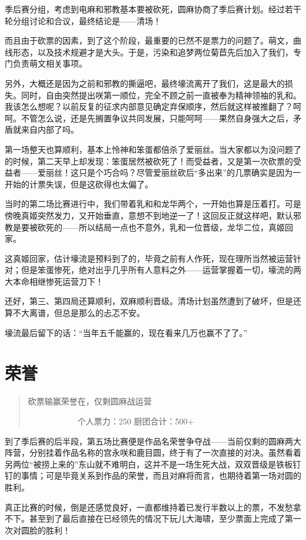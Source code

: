 季后赛分组，考虑到电麻和邪教基本要被砍死，圆麻协商了季后赛计划。经过若干轮分组讨论和合议，最终结论是——清场！

而且由于砍票的因素，到了这个阶段，最重要的已然不是票力的问题了。萌文，曲线形态，以及技术规避才是大头。于是，污染和追梦两位菊苣先后加入了我们，专门负责萌文相关事项。

另外，大概还是因为之前和邪教的撕逼吧，最终壕流离开了我们，这是最大的损失。同时，自由突然提出咲第一顺位，完全不顾之前一直被奉为精神领袖的乳和。我该怎么想呢？以前反复的征求内部意见确定弃保顺序，然后就这样被推翻了？呵呵。不管怎么说，还是先搁置争议共同发展，只能呵呵——果然自身强大之后，矛盾就来自内部了吗。

第一场整天也算顺利，基本上怜神和笨蛋都倍杀了爱丽丝。当大家都以为没问题了的时候，第二天早上却发现：笨蛋居然被砍死了！而受益者，又是第一次砍票的受益者——爱丽丝！这只是个巧合吗？尽管爱丽丝砍后“多出来”的几票确实是因为一开始的计票失误，但是这砍得也太偏了。

当时的第二场比赛进行中，我们带着乳和和龙华两个，一开始也算是压着打。可是傍晚真姬突然发力，又开始垂直，意想不到地逆一了！这回反正就这样吧，默认邪教是要被砍死的——所以结局一点也不意外，乳和一位晋级，龙华二位，真姬回家。

这真姬回家，估计壕流是预料到了的，毕竟之前有人作死，现在理所当然被运营针对；但是笨蛋惨死，绝对出乎几乎所有人意料之外——运营掌握着一切，壕流的两大本命相继惨死运营刀下！

还好，第三、第四局还算顺利，双麻顺利晋级。清场计划虽然遭到了破坏，但是还算不大离谱，但总是那么的忐忑不安。

壕流最后留下的话：“当年五千能赢的，现在看来几万也赢不了了。”


\section{荣誉}
\begin{quote}
砍票输赢荣誉在，仅剩圆麻战运营

　　　　　　个人票力：250 厨团合计：500+
\end{quote}

到了季后赛的后半段，第五场比赛便是作品名荣誉争夺战——当前仅剩的圆麻两大阵营，分别挂着作品名称的宫永咲和鹿目圆，终于有了一次直接的对决。虽然看着另两位“被捞上来的”东山就不难明白，这并不是一场生死大战，双双晋级是铁板钉钉的事情；可是毕竟关系到作品的荣誉，而且对麻将而言，也期待着第一场对圆的胜利。

真正比赛的时候，倒是还感觉良好，一直都维持着已发行半数以上的票，不发愁拿不下。甚至到了最后直接在已经领先的情况下玩儿大海啸，至少票面上完成了第一次对圆脸的胜利！

